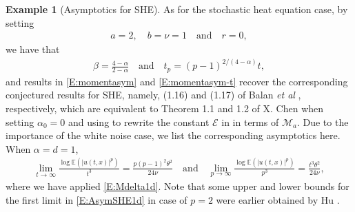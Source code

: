 \documentclass[a4paper,11pt]{article}
\numberwithin{equation}{section}
\numberwithin{equation}{section}
\theoremstyle{plain}
\theoremstyle{definition}
\newtheorem{example}[theorem]{Example}
\newcommand{\E}{\mathbb{E}}
\begin{document}
\begin{example}[Asymptotics for SHE]
  \label{Eg:AsymSHE} As for the stochastic heat equation case, by setting
  \begin{align*}
    a = 2,\quad b= \nu = 1 \quad \text{and} \quad r = 0,
  \end{align*}
  we have that
  \begin{align*}
    \beta = \frac{4-\alpha}{2-\alpha} \quad \text{and} \quad
    t_p=(p-1)^{2/(4-\alpha)}t,
  \end{align*}
  and results in \eqref{E:momentasym} and \eqref{E:momentasym-t} recover the corresponding
  conjectured results for SHE, namely, (1.16) and (1.17) of Balan {\it et al} \cite{BCC21},
  respectively, which are equivalent to Theorem 1.1 and 1.2 of X. Chen \cite{Chen17AIHP} when
  setting $\alpha_0=0$ and using \cite[Lemma A.2]{15AIHP} to rewrite the constant $\mathcal{E}$ in
  \cite{Chen17AIHP} in terms of $\mathcal{M}_a$. Due to the importance of the white noise case, we
  list the corresponding asymptotics here. When $\alpha=d=1$,
  \begin{align} \label{E:AsymSHE1d}
    \lim_{t \to \infty} \frac{\log \E\left(|u(t,x)|^p\right)}{t^3} = \frac{p(p-1)^2\theta^2}{24\nu}
    \quad \text{and} \quad
    \lim_{p \to \infty} \frac{\log \E\left(|u(t,x)|^p\right)}{p^3} = \frac{t^3\theta^2}{24\nu},
  \end{align}
  where we have applied \eqref{E:Mdelta1d}. Note that some upper and lower bounds for the first
  limit in \eqref{E:AsymSHE1d} in case of $p=2$ were earlier obtained by Hu \cite[part 1) of Theorem
  4.1]{Hu02Chaos}.
\end{example}
\end{document}
